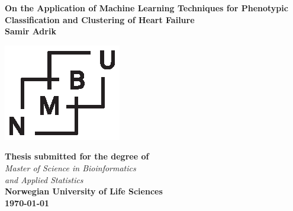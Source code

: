 \documentclass[../thesis.tex]{subfiles}
\begin{document}
\begin{titlepage}
\begin{center}
\vspace*{0,25cm}\Large{\textbf{On the Application of Machine Learning Techniques for Phenotypic Classification and Clustering of Heart Failure}}\\[0,4cm]

\vspace*{1,5cm}\large{\textbf{Samir Adrik}}

\vspace*{3cm}\includegraphics[scale=1.5]{../images/NMBU.eps}

\vspace{1cm}\normalsize{\textbf{Thesis submitted for the degree of}\\[0,1cm] \textit{Master of Science in Bioinformatics\\ and Applied Statistics}}\\[0,5cm]

\normalsize{\textbf{Norwegian University of Life Sciences}}\\[0,5cm]

\normalsize{\textbf{\today}}
\end{center}
\end{titlepage}

\newpage{\pagestyle{empty}\cleardoublepage}
\end{document}
